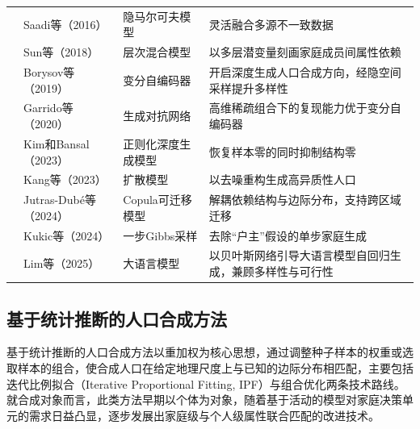 {\begin{longtable}{@{}L{1.9cm}L{3.3cm}L{2.8cm}L{5.4cm}@{}}
 & Saadi等（2016）\citep{saadiHiddenMarkovModelbased2016} & 隐马尔可夫模型 & 灵活融合多源不一致数据 \\
 & Sun等（2018）\citep{sunHierarchicalMixtureModeling2018} & 层次混合模型 & 以多层潜变量刻画家庭成员间属性依赖 \\
 & Borysov等（2019）\citep{borysovHowGenerateMicroagents2019} & 变分自编码器 & 开启深度生成人口合成方向，经隐空间采样提升多样性 \\
 & Garrido等（2020）\citep{garridoPredictionRareFeature2020} & 生成对抗网络 & 高维稀疏组合下的复现能力优于变分自编码器 \\
 & Kim和Bansal（2023）\citep{kimDeepGenerativeModel2023} & 正则化深度生成模型 & 恢复样本零的同时抑制结构零 \\
 & Kang等（2023）\citep{kangGeneratingPopulationSynthesis2023} & 扩散模型 & 以去噪重构生成高异质性人口 \\
 & Jutras-Dub\'e等（2024）\citep{jutras-dubeCopulabasedTransferableModels2024} & Copula可迁移模型 & 解耦依赖结构与边际分布，支持跨区域迁移 \\
 & Kukic等（2024）\citep{kukicOnestepGibbsSampling2024a} & 一步Gibbs采样 & 去除``户主''假设的单步家庭生成 \\
 & Lim等（2025）\citep{limLargeLanguageModel2025} & 大语言模型 & 以贝叶斯网络引导大语言模型自回归生成，兼顾多样性与可行性 \\
\end{longtable}
}

\subsection{基于统计推断的人口合成方法}\label{subsec.review.popsyn.stat}

基于统计推断的人口合成方法以重加权为核心思想，通过调整种子样本的权重或选取样本的组合，使合成人口在给定地理尺度上与已知的边际分布相匹配，主要包括迭代比例拟合（Iterative Proportional Fitting, IPF）与组合优化两条技术路线。就合成对象而言，此类方法早期以个体为对象，随着基于活动的模型对家庭决策单元的需求日益凸显，逐步发展出家庭级与个人级属性联合匹配的改进技术。

